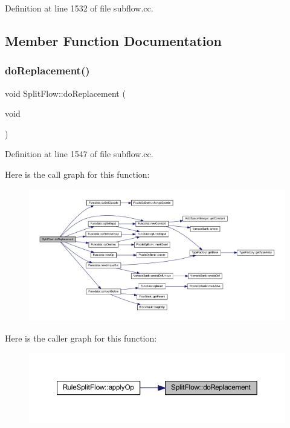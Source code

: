 Definition at line 1532 of file subflow.\+cc.



\subsection{Member Function Documentation}
\mbox{\label{class_split_flow_a2a1fc042a07bb2abb0fd1521df574c2c}} 
\subsubsection{\texorpdfstring{doReplacement()}{doReplacement()}}
{\footnotesize\ttfamily void Split\+Flow\+::do\+Replacement (\begin{DoxyParamCaption}\item[{void}]{ }\end{DoxyParamCaption})}



Definition at line 1547 of file subflow.\+cc.

Here is the call graph for this function\+:
\nopagebreak
\begin{figure}[H]
\begin{center}
\leavevmode
\includegraphics[width=350pt]{class_split_flow_a2a1fc042a07bb2abb0fd1521df574c2c_cgraph}
\end{center}
\end{figure}
Here is the caller graph for this function\+:
\nopagebreak
\begin{figure}[H]
\begin{center}
\leavevmode
\includegraphics[width=350pt]{class_split_flow_a2a1fc042a07bb2abb0fd1521df574c2c_icgraph}
\end{center}
\end{figure}
\mbox{\label{class_split_flow_a45e3612033f7082f63af36a551f64917}} 
